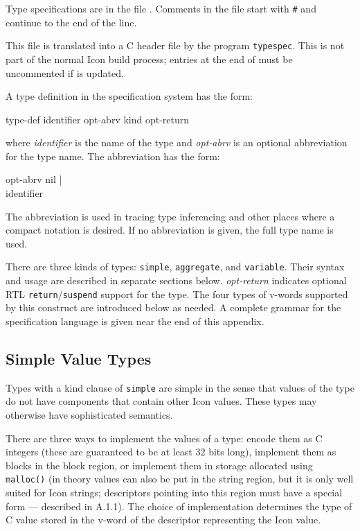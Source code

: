 Type specifications are in the file .  Comments
in the file start with \texttt{\#} and continue to the end of the line.

This file is translated into a C header file by the program \texttt{typespec}.
This is not part of the normal Icon build process; entries at the end of
 must be uncommented if  is
updated.

A type definition in the specification system has the form:

\begin{ebnf}
type-def \cceq identifier opt-abrv \tokcolon kind opt-return
\end{ebnf}

\noindent
where \textit{identifier} is the name of the type and \textit{opt-abrv} is an optional abbreviation for the type name. The abbreviation
has the form:

\begin{ebnf}
opt-abrv \cceq nil |\\
\>\>\>\> \toklcbra identifier \tokrcbra
\end{ebnf}

\noindent
The abbreviation is used in tracing type inferencing and other places where
a compact notation is desired. If no abbreviation is given, the full type
name is used.

There are three kinds of types: \texttt{simple}, \texttt{aggregate}, and
\texttt{variable}. Their syntax and usage are described in separate
sections below. \textit{opt-return} indicates optional RTL
\texttt{return}/\texttt{suspend} support for the type. The four types of
v-words supported by this construct are introduced below as needed. A
complete grammar for the specification language is given near the end of
this appendix.

\subsection{Simple Value Types}
Types with a kind clause of \texttt{simple} are simple in the sense that
values of the type do not have components that contain other Icon
values. These types may otherwise have sophisticated semantics.

There are three ways to implement the values of a type: encode them as C
integers (these are guaranteed to be at least 32 bits long), implement them
as blocks in the block region, or implement them in storage allocated using
\texttt{malloc()} (in theory values can also be put in the string region, but it is
only well suited for Icon strings; descriptors pointing into this region
must have a special form --- described in A.1.1). The choice of
implementation determines the type of C value stored in the v-word of the
descriptor representing the Icon value.

